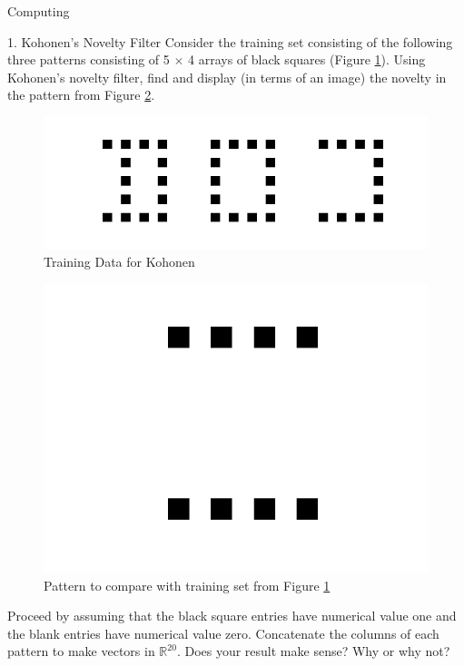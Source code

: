 \begin{section}{Computing}

\begin{homeworkSection}{1. Kohonen's Novelty Filter }
Consider the training set consisting of the following three patterns consisting of 5 $\times$ 4 arrays of black squares (Figure \ref{fig:training}). Using Kohonen's novelty filter, find and display (in terms of an image) the novelty in the pattern from Figure \ref{fig:pattern}.

\begin{figure}[H]
\centering
\includegraphics[width=0.75\columnwidth]{../data/kohonen_training}
\caption{Training Data for Kohonen}
\label{fig:training}
\end{figure}


\begin{figure}[H]
\centering
\includegraphics[width=0.35\columnwidth]{../data/pattern}
\caption{Pattern to compare with training set from Figure \ref{fig:training}}
\label{fig:pattern}
\end{figure}

Proceed by assuming that the black square entries have numerical value one and the blank entries have numerical value zero. Concatenate the columns of each pattern to make vectors in $\mathbb{R}^{20}$. Does your result make sense? Why or why not?

\end{homeworkSection}
\end{section}
